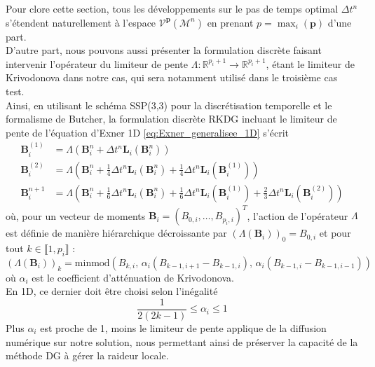 \documentclass[11pt, a4paper, oneside]{report}
\begin{document}
Pour clore cette section, tous les développements sur le pas de temps optimal $\Delta t^n$ s'étendent naturellement à l'espace $\mathcal{V}^\mathbf{p}(\mathcal{M}^n)$ en prenant $p = \max_i (\mathbf{p})$ d'une part. \\
D'autre part, nous pouvons aussi présenter la formulation discrète faisant intervenir l'opérateur du limiteur de pente $\Lambda : \mathbb{R}^{p_i + 1} \longrightarrow \mathbb{R}^{p_i + 1}$, étant le limiteur de Krivodonova dans notre cas, qui sera notamment utilisé dans le troisième cas test. \\
Ainsi, en utilisant le schéma SSP(3,3) pour la discrétisation temporelle et le formalisme de Butcher, la formulation discrète RKDG incluant le limiteur de pente de l'équation d'Exner 1D \eqref{eq:Exner_generalisee_1D} s'écrit
\begin{equation}
    \begin{aligned}
        \bm{B}_i^{(1)} & = \Lambda \left( \bm{B}_i^n + \Delta t^n \bm{L}_i \left( \bm{B}_i^n \right) \right) \\
        \bm{B}_i^{(2)} & = \Lambda \left( \bm{B}_i^n + \frac{1}{4} \Delta t^n \bm{L}_i \left( \bm{B}_i^{n} \right) + \frac{1}{4} \Delta t^n \bm{L}_i \left( \bm{B}_i^{(1)} \right) \right) \\
        \bm{B}_i^{n+1} & = \Lambda \left( \bm{B}_i^n + \frac{1}{6} \Delta t^n \bm{L}_i \left( \bm{B}_i^{n} \right) + \frac{1}{6} \Delta t^n \bm{L}_i \left( \bm{B}_i^{(1)} \right) + \frac{2}{3} \Delta t^n \bm{L}_i \left( \bm{B}_i^{(2)} \right) \right)
    \end{aligned}
\end{equation}
où, pour un vecteur de moments $\bm{B}_i = (B_{0, i}, \dots, B_{p_i, i})^T$, l'action de l'opérateur $\Lambda$ est définie de manière hiérarchique décroissante par $\left(\Lambda(\bm{B}_i)\right)_0 = B_{0,i}$ et pour tout $k \in \llbracket 1, p_i \rrbracket$ :
\begin{equation}
    \left(\Lambda(\bm{B}_i)\right)_k = \text{minmod} \left( B_{k,i}, \, \alpha_i \left( B_{k-1,i+1} - B_{k-1,i} \right), \, \alpha_i \left( B_{k-1,i} - B_{k-1,i-1} \right) \right)
\end{equation}
où $\alpha_i$ est le coefficient d'atténuation de Krivodonova. \\
En 1D, ce dernier doit être choisi selon l'inégalité
\begin{equation}
    \frac{1}{2(2k-1)} \leq \alpha_i \leq 1
\end{equation}
Plus $\alpha_i$ est proche de 1, moins le limiteur de pente applique de la diffusion numérique sur notre solution, nous permettant ainsi de préserver la capacité de la méthode DG à gérer la raideur locale.
\end{document}
